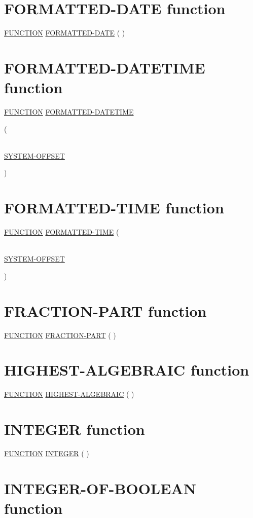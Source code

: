 \documentclass[a4paper,oneside,svgnames]{scrbook}
\makeatletter
\newcommand{\key}[1]{\underline{#1}}
\newcommand{\gnucobol}[1]{%
  \colorbox{orange!75}{#1}}
\newenvironment{0-1}{$\left[ \begin{tabular}{@{}l@{}}}{\end{tabular} \right]$}
\makeatother
\begin{document}
\section{FORMATTED-DATE function}

\key{FUNCTION} \key{FORMATTED-DATE} ( \argument \argument)

\section{FORMATTED-DATETIME function}

\key{FUNCTION} \key{FORMATTED-DATETIME}

( \argument \argument \argument
\begin{0-1}
  \argument \\
  \gnucobol{\key{SYSTEM-OFFSET}}
\end{0-1}
)

\section{FORMATTED-TIME function}

\key{FUNCTION} \key{FORMATTED-TIME} ( \argument \argument
\begin{0-1}
  \argument \\
  \gnucobol{\key{SYSTEM-OFFSET}}
\end{0-1}
)

\section{FRACTION-PART function}

\key{FUNCTION} \key{FRACTION-PART} ( \argument )

\section{HIGHEST-ALGEBRAIC function}

\key{FUNCTION} \key{HIGHEST-ALGEBRAIC} ( \argument )

\section{INTEGER function}

\key{FUNCTION} \key{INTEGER} ( \argument )

\section{INTEGER-OF-BOOLEAN function}
\end{document}
